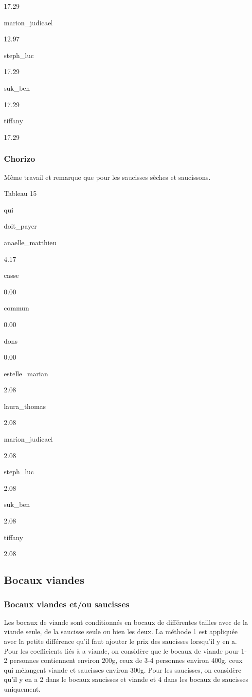 \documentclass[]{article}
\begin{document}
17.29

marion\_judicael

12.97

steph\_luc

17.29

suk\_ben

17.29

tiffany

17.29

\hypertarget{chorizo}{%
\subsubsection{Chorizo}\label{chorizo}}

Même travail et remarque que pour les saucisses sèches et saucissons.

Tableau 15

qui

doit\_payer

anaelle\_matthieu

4.17

casse

0.00

commun

0.00

dons

0.00

estelle\_marian

2.08

laura\_thomas

2.08

marion\_judicael

2.08

steph\_luc

2.08

suk\_ben

2.08

tiffany

2.08

\hypertarget{bocaux-viandes}{%
\subsection{Bocaux viandes}\label{bocaux-viandes}}

\hypertarget{bocaux-viandes-etou-saucisses}{%
\subsubsection{Bocaux viandes et/ou
saucisses}\label{bocaux-viandes-etou-saucisses}}

Les bocaux de viande sont conditionnés en bocaux de différentes tailles
avec de la viande seule, de la saucisse seule ou bien les deux. La
méthode 1 est appliquée avec la petite différence qu'il faut ajouter le
prix des saucisses lorsqu'il y en a. Pour les coefficients liés à a
viande, on considère que le bocaux de viande pour 1-2 personnes
contiennent environ 200g, ceux de 3-4 personnes environ 400g, ceux qui
mélangent viande et saucisses environ 300g. Pour les saucisses, on
considère qu'il y en a 2 dans le bocaux saucisses et viande et 4 dans
les bocaux de saucisses uniquement.
\end{document}

